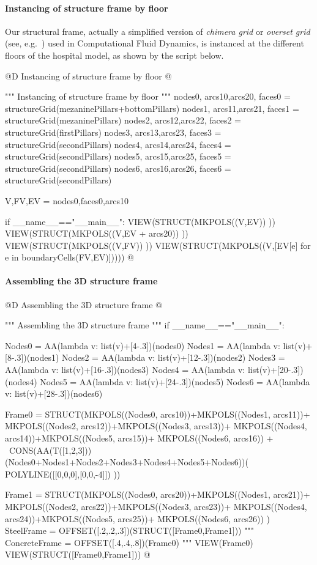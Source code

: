 \documentclass[11pt,oneside]{article}    %
\begin{document}
\paragraph{Instancing of structure frame by floor}

Our structural frame, actually a simplified version of \emph{chimera grid} or \emph{overset grid} (see, e.g.~\cite{Meakin:99}) used in Computational Fluid Dynamics, is instanced at the different floors of the hospital model, as shown by the script below.

@D Instancing of structure frame by floor 
@{""" Instancing of structure frame by floor """
nodes0, arcs10,arcs20, faces0 = structureGrid(mezaninePillars+bottomPillars)
nodes1, arcs11,arcs21, faces1 = structureGrid(mezaninePillars)
nodes2, arcs12,arcs22, faces2 = structureGrid(firstPillars)
nodes3, arcs13,arcs23, faces3 = structureGrid(secondPillars)
nodes4, arcs14,arcs24, faces4 = structureGrid(secondPillars)
nodes5, arcs15,arcs25, faces5 = structureGrid(secondPillars)
nodes6, arcs16,arcs26, faces6 = structureGrid(secondPillars)

V,FV,EV = nodes0,faces0,arcs10

if __name__=="__main__":
    VIEW(STRUCT(MKPOLS((V,EV)) ))
    VIEW(STRUCT(MKPOLS((V,EV + arcs20)) ))
    VIEW(STRUCT(MKPOLS((V,FV)) ))
    VIEW(STRUCT(MKPOLS((V,[EV[e] for e in boundaryCells(FV,EV)]))))
@}


\paragraph{Assembling the 3D structure frame}
@D Assembling the 3D structure frame 
@{""" Assembling the 3D structure frame """
if __name__=="__main__":

    Nodes0 = AA(lambda v: list(v)+[4-.3])(nodes0)
    Nodes1 = AA(lambda v: list(v)+[8-.3])(nodes1)
    Nodes2 = AA(lambda v: list(v)+[12-.3])(nodes2)
    Nodes3 = AA(lambda v: list(v)+[16-.3])(nodes3)
    Nodes4 = AA(lambda v: list(v)+[20-.3])(nodes4)
    Nodes5 = AA(lambda v: list(v)+[24-.3])(nodes5)
    Nodes6 = AA(lambda v: list(v)+[28-.3])(nodes6)
    
    Frame0 = STRUCT(MKPOLS((Nodes0, arcs10))+MKPOLS((Nodes1, arcs11))+
        MKPOLS((Nodes2, arcs12))+MKPOLS((Nodes3, arcs13))+
        MKPOLS((Nodes4, arcs14))+MKPOLS((Nodes5, arcs15))+
        MKPOLS((Nodes6, arcs16)) + \
        CONS(AA(T([1,2,3]))(Nodes0+Nodes1+Nodes2+Nodes3+Nodes4+Nodes5+Nodes6))(
        POLYLINE([[0,0,0],[0,0,-4]])  ))
    
    Frame1 = STRUCT(MKPOLS((Nodes0, arcs20))+MKPOLS((Nodes1, arcs21))+
        MKPOLS((Nodes2, arcs22))+MKPOLS((Nodes3, arcs23))+
        MKPOLS((Nodes4, arcs24))+MKPOLS((Nodes5, arcs25))+
        MKPOLS((Nodes6, arcs26)) )
    SteelFrame = OFFSET([.2,.2,.3])(STRUCT([Frame0,Frame1]))
    """
    ConcreteFrame = OFFSET([.4,.4,.8])(Frame0)
    """
    VIEW(Frame0)
    VIEW(STRUCT([Frame0,Frame1]))
@}
\end{document}

